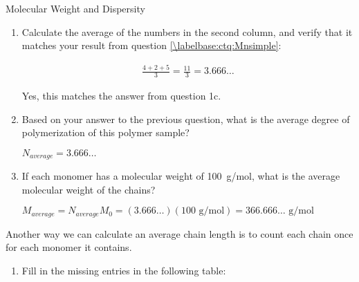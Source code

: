 \begin{activity}{Molecular Weight and Dispersity}
\begin{ctqs}
\begin{enumerate}
			\item Calculate the average of the numbers in the second column, and verify that it matches your result from question \ref{\labelbase:ctq:Mnsimple}:
			
				\begin{solution}[1in]
					\begin{align*}
						\frac{4+2+5}{3} = \frac{11}{3} = 3.666\dots
					\end{align*}
					
					Yes, this matches the answer from question 1c.%
					
				\end{solution}
			
			\item Based on your answer to the previous question, what is the average degree of polymerization of this polymer sample?
			
				\begin{solution}[0.75in]
				
					$N_{average} = 3.666\dots$
					
				\end{solution}
				
			\item If each monomer has a molecular weight of 100~g/mol, what is the average molecular weight of the chains?
			
				\begin{solution}[1in]
				
					$M_{average} = N_{average}M_0 = (3.666\dots)(100\text{ g/mol}) = 366.666\dots\text{ g/mol}$
				
				\end{solution}
				
		\end{enumerate}
	
	\clearpage
	\question Another way we can calculate an average chain length is to count each chain once for each monomer it contains.
				\label{\labelbase:ctq:Mwcalc}
	
		\begin{enumerate}
			\item Fill in the missing entries in the following table:
			

\end{enumerate}
\end{ctqs}
\end{activity}
